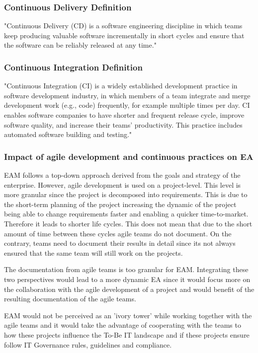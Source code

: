 \subsubsection{Continuous Delivery Definition}
"Continuous Delivery (CD) is a software engineering discipline in which teams keep producing valuable software incrementally in short cycles and ensure that the software can be reliably released at any time." \cite{Chen2015}

\subsubsection{Continuous Integration Definition}
"Continuous Integration (CI) is a widely established
development practice in software development industry,
in which members of a team integrate and merge development
work (e.g., code) frequently, for example multiple
times per day. CI enables software companies to have shorter
and frequent release cycle, improve software quality, and
increase their teams' productivity. This practice includes
automated software building and testing."\cite{Shahin2017}\cite{Chen2015}

\subsubsection{Impact of agile development and continuous practices on EA}
EAM follows a top-down approach derived from the goals and strategy of the enterprise. \cite{Hanschke2015} However, agile development is used on a project-level. This level is more granular since the project is decomposed into requirements. This is due to the short-term planning of the project increasing the dynamic of the project being able to change requirements faster and enabling a quicker time-to-market. Therefore it leads to shorter life cycles. This does not mean that due to the short amount of time between these cycles agile teams do not document. On the contrary, teams need to document their results in detail since its not always ensured that the same team will still work on the projects.

The documentation from agile teams is too granular for EAM. Integrating these two perspectives would lead to a more dynamic EA since it would focus more on the collaboration with the agile development of a project and would benefit of the resulting documentation of the agile teams. 

EAM would not be perceived as an 'ivory tower' while working together with the agile teams and it would take the advantage of cooperating with the teams to how these projects influence the To-Be IT landscape and if these projects ensure follow IT Governance rules, guidelines and compliance. \cite{Hanschke2015}

